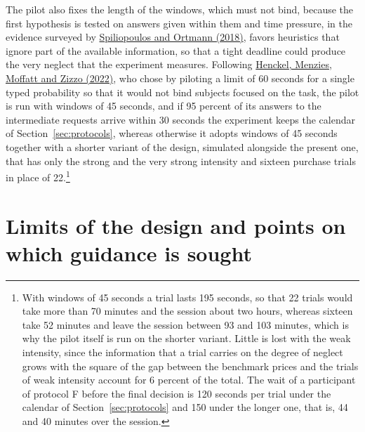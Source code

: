 \documentclass[11pt,a4paper]{article}
\newcommand{\cy}[2]{\hyperlink{cite.#1}{\textcolor{citecolor}{#2}}}
\newcommand{\prot}[1]{\textsf{#1}}
\begin{document}
The pilot also fixes the length of the windows, which must not bind, because the first hypothesis is tested on answers given within them and time pressure, in the evidence surveyed by \cy{spiliopoulos}{Spiliopoulos and Ortmann (2018)}, favors heuristics that ignore part of the available information, so that a tight deadline could produce the very neglect that the experiment measures. Following \cy{henckel}{Henckel, Menzies, Moffatt and Zizzo (2022)}, who chose by piloting a limit of 60 seconds for a single typed probability so that it would not bind subjects focused on the task, the pilot is run with windows of 45 seconds, and if 95 percent of its answers to the intermediate requests arrive within 30 seconds the experiment keeps the calendar of Section~\ref{sec:protocols}, whereas otherwise it adopts windows of 45 seconds together with a shorter variant of the design, simulated alongside the present one, that has only the strong and the very strong intensity and sixteen purchase trials in place of 22.\footnote{With windows of 45 seconds a trial lasts 195 seconds, so that 22 trials would take more than 70 minutes and the session about two hours, whereas sixteen take 52 minutes and leave the session between 93 and 103 minutes, which is why the pilot itself is run on the shorter variant. Little is lost with the weak intensity, since the information that a trial carries on the degree of neglect grows with the square of the gap between the benchmark prices and the trials of weak intensity account for 6 percent of the total. The wait of a participant of protocol \prot{F} before the final decision is 120 seconds per trial under the calendar of Section~\ref{sec:protocols} and 150 under the longer one, that is, 44 and 40 minutes over the session.}

\section{Limits of the design and points on which guidance is sought}\label{sec:limits}
\end{document}
